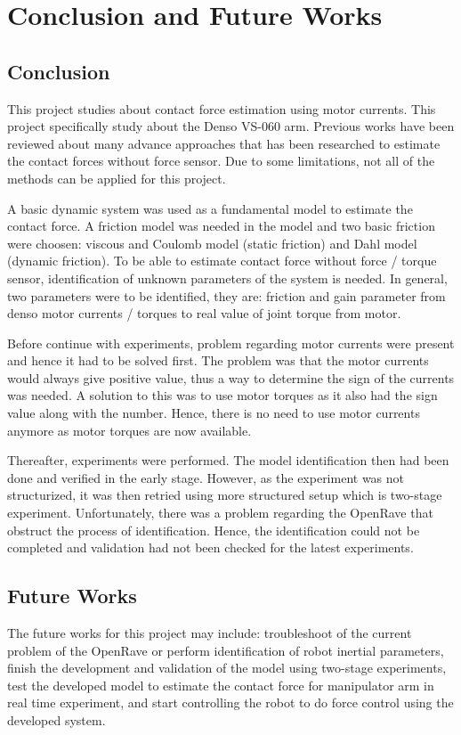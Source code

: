 \chapter{Conclusion and Future Works}
\section{Conclusion}
This project studies about contact force estimation using motor currents. This project specifically study about the Denso VS-060 arm. Previous works have been reviewed about many advance approaches that has been researched to estimate the contact forces without force sensor. Due to some limitations, not all of the methods can be applied for this project. 

A basic dynamic system was used as a fundamental model to estimate the contact force. A friction model was needed in the model and two basic friction were choosen: viscous and Coulomb model (static friction) and Dahl model (dynamic friction). To be able to estimate contact force without force / torque sensor, identification of unknown parameters of the system is needed. In general, two parameters were to be identified, they are: friction and gain parameter from denso motor currents / torques to real value of joint torque from motor. 

Before continue with experiments, problem regarding motor currents were present and hence it had to be solved first. The problem was that the motor currents would always give positive value, thus a way to determine the sign of the currents was needed. A solution to this was to use motor torques as it also had the sign value along with the number. Hence, there is no need to use motor currents anymore as motor torques are now available. 

Thereafter, experiments were performed. The model identification then had been done and verified in the early stage. However, as the experiment was not structurized, it was then retried using more structured setup which is two-stage experiment. Unfortunately, there was a problem regarding the OpenRave that obstruct the process of identification. Hence, the identification could not be completed and validation had not been checked for the latest experiments.

\section{Future Works}
The future works for this project may include: troubleshoot of the current problem of the OpenRave or perform identification of robot inertial parameters, finish the development and validation of the model using two-stage experiments, test the developed model to estimate the contact force for manipulator arm in real time experiment, and start controlling the robot to do force control using the developed system. 



